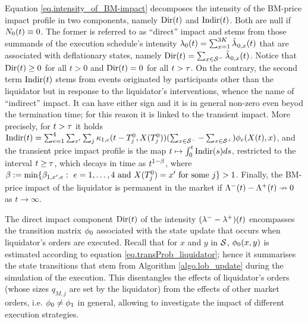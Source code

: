 \documentclass[10pt, article,table]{article}
\begin{document}
 Equation \eqref{eq.intensity_of_BM-impact} decomposes the intensity of the BM-price impact profile in two components, namely $\directImpact(t)$ and $\indirectImpact(t)$. Both are null if $\countingProc[0] (t) \equiv 0$. The former is referred to as ``direct'' impact and stems from those summands of the execution schedule's intensity $\intensity[0](t) = \sum_{x=1}^{3K}\hybridIntensity_{0,x}(t)$ that are associated with deflationary states, namely $\directImpact(t) = \sum_{x\in\deflationarySpace} \hybridIntensity_{0,x}(t)$. Notice that $\directImpact(t)\geq 0$ for all $t>0$ and  $\directImpact(t) = 0$ for all $t>\terminationTime$. On the contrary, the second term $\indirectImpact(t)$ stems from events originated by participants other than the liquidator but in response to the liquidator's interventions, whence the name of ``indirect'' impact. It can have either sign and it is in general non-zero even beyod the termination time; for this reason it is linked to the transient impact. More precisely, for $t>\terminationTime$ it holds $\indirectImpact(t) = \sum_{e=1}^{4}\sum_{\xone} \sum_{j} \hawkesKernel_{1,e}(t-\arrivalTimes[0]_j,\stateVariable(\arrivalTimes[0]_j)) (\sum_{x\in \deflationarySpace} - \sum_{x\in \inflationarySpace})\transProb_{e}(\stateVariable(t),x)$, and  the transient price impact profile is the map $t\mapsto \intzerot \indirectImpact(s)ds$, restricted to the interval $t\geq \terminationTime$, which decays in time as $t^{1-\decCoef}$, where $\decCoef := \min\lbrace \decCoef_{1,\xone,e}: \, \, e=1,\dots,4 \text{ and } \stateVariable(\arrivalTimes[0]_j) = \xone \text{ for some }j\rbrace > 1$. Finally, the BM-price impact of the liquidator is permanent in the market if $\compensator^{-}(t) - \compensator^{+}(t) \nrightarrow 0$ as $t\rightarrow\infty$. 
 
 The direct impact component $\directImpact(t)$ of the intensity $(\intensityDeflationary - \intensityInflationary)(t)$ encompasses the transition matrix $\transProb_0$ associated with the state update that occurs when liquidator's orders are executed. Recall that for $x$ and $y$ in $\stateSpace$, $\transProb_{0}(x,y)$ is estimated according to equation \eqref{eq.transProb_liquidator}; hence it summarises the state transitions that stem from Algorithm \ref{algo.lob_update} during the simulation of the execution. This disentangles the effects of liquidator's orders (whose sizes $q_{M,j}$ are set by the liquidator) from the effects of other market orders, i.e. $\transProb_0 \neq \transProb_1$ in general, allowing to investigate the impact of different execution strategies.
 
\end{document}
